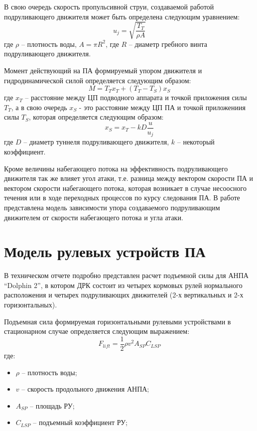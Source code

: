 В свою очередь скорость пропульсивной струи, создаваемой работой подруливающего движителя может быть определена следующим уравнением:
\begin{equation}
    \label{eq:jetflow_speed}
	u_j = \sqrt{\frac{T_T}{\rho A}}
\end{equation}
\noindent где $\rho$ -- плотность воды, $A=\pi R^2$, где $R$ -- диаметр гребного винта подруливающего движителя.

Момент действующий на ПА формируемый упором движителя и гидродинамической силой определяется следующим образом:
\begin{equation*}
	M = T_T x_T + (T_T-T_S)x_S
\end{equation*}
\noindent где $x_T$ -- расстояние между ЦП подводного аппарата и точкой приложения силы $T_T$, а в свою очередь $x_S$ - это расстояние между ЦП ПА и точкой приложениия силы $T_S$, которая определяется следующим образом:
\begin{equation*}
	x_S = x_T - kD\frac{u}{u_j}
\end{equation*}
\noindent где $D$ -- диаметр туннеля подруливающего движителя, $k$ -- некоторый коэффициент.

Кроме величины набегающего потока на эффективность подруливающего движителя так же влияет угол атаки, т.е. разница между вектором скорости ПА и вектором скорости набегающего потока, которая возникает в случае несоосного течения или в ходе переходных процессов по курсу следования ПА.
В работе \cite{palmer2008modelling} представлена модель зависимости упора создаваемого подруливающим движителем от скорости набегающего потока и угла атаки.

\section{Модель рулевых устройств ПА}
В техническом отчете \cite{steenson2011control} подробно представлен расчет подъемной силы для АНПА ``Dolphin 2'', в котором ДРК состоит из четырех кормовых рулей нормального расположения и четырех подруливающих движителей (2-х вертикальных и 2-х горизонтальных).

Подъемная сила формируемая горизонтальными рулевыми устройствами в стационарном случае определяется следующим выражением:
\begin{equation}
    F_{lift} = \frac{1}{2}\rho v^2 A_{SP} C_{LSP}
\end{equation}
\noindent где:
\begin{itemize}
    \item $\rho$ -- плотность воды;
    \item $v$ -- скорость продольного движения АНПА;
    \item $A_{SP}$ -- площадь РУ;
    \item $C_{LSP}$ -- подъемный коэффициент РУ;
\end{itemize}

